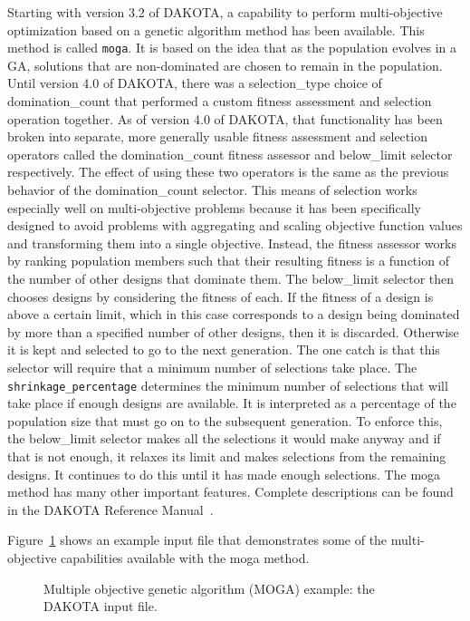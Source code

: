Starting with version 3.2 of DAKOTA, a capability to perform
multi-objective optimization based on a genetic algorithm method has
been available.  This method is called \texttt{moga}.  It is based on
the idea that as the population evolves in a GA, solutions that are
non-dominated are chosen to remain in the population.  Until version
4.0 of DAKOTA, there was a selection\_type choice of domination\_count
that performed a custom fitness assessment and selection operation
together.  As of version 4.0 of DAKOTA, that functionality has been
broken into separate, more generally usable fitness assessment and
selection operators called the domination\_count fitness assessor and
below\_limit selector respectively.  The effect of using these two
operators is the same as the previous behavior of the
domination\_count selector.  This means of selection works especially
well on multi-objective problems because it has been specifically
designed to avoid problems with aggregating and scaling objective
function values and transforming them into a single
objective. Instead, the fitness assessor works by ranking population
members such that their resulting fitness is a function of the number
of other designs that dominate them.  The below\_limit selector then
chooses designs by considering the fitness of each. If the fitness of
a design is above a certain limit, which in this case corresponds to a
design being dominated by more than a specified number of other
designs, then it is discarded. Otherwise it is kept and selected to go
to the next generation. The one catch is that this selector will
require that a minimum number of selections take
place. The \texttt{shrinkage\_percentage} determines the minimum number of
selections that will take place if enough designs are available. It is
interpreted as a percentage of the population size that must go on to
the subsequent generation. To enforce this, the below\_limit selector
makes all the selections it would make anyway and if that is not
enough, it relaxes its limit and makes selections from the remaining
designs.  It continues to do this until it has made enough selections.
The moga method has many other important features.  Complete
descriptions can be found in the DAKOTA Reference Manual~\cite{RefMan}.

Figure~\ref{tutorial:moga} shows an example input file that
demonstrates some of the multi-objective capabilities available with
the moga method.
\begin{figure}[htp!]
  \centering
  \begin{bigbox}
    \begin{small}
    \end{small}
  \end{bigbox}
  \caption{Multiple objective genetic algorithm (MOGA) example: the
    DAKOTA input file.}
  \label{tutorial:moga}
\end{figure}

